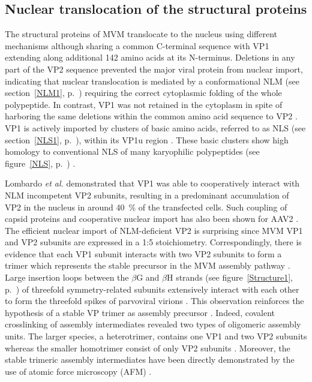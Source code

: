\subsection{Nuclear translocation of the structural proteins}
\label{Struc Transloc}
The structural proteins of MVM translocate to the nucleus using different mechanisms although sharing a common C-terminal sequence with VP1 extending along additional 142 amino acids at its N-terminus. Deletions in any part of the VP2 sequence prevented the major viral protein from nuclear import, indicating that nuclear translocation is mediated by a conformational NLM (see section~\ref{NLM1}, p.~\pageref{NLM1}) requiring the correct cytoplasmic folding of the whole polypeptide. In contrast, VP1 was not retained in the cytoplasm in spite of harboring the same deletions within the common amino acid sequence to VP2 \cite{pmid10729155}. VP1 is actively imported by clusters of basic amino acids, referred to as NLS (see section~\ref{NLS1}, p.~\pageref{NLS1}), within its VP1u region \cite{pmid12072505}. These basic clusters show high homology to conventional NLS of many karyophilic polypeptides (see figure~\ref{NLS}, p.~\pageref{NLS}) \cite{pmid2004116, pmid6088992}. 

Lombardo \textit{et al.} demonstrated that VP1 was able to cooperatively interact with NLM incompetent VP2 subunits, resulting in a predominant accumulation of VP2 in the nucleus in around 40~\% of the transfected cells. Such coupling of capsid proteins and cooperative nuclear import has also been shown for AAV2 \cite{pmid1331503}. The efficient nuclear import of NLM-deficient VP2 is surprising since MVM VP1 and VP2 subunits are expressed in a 1:5 stoichiometry. Correspondingly, there is evidence that each VP1 subunit interacts with two VP2 subunits to form a trimer which represents the stable precursor in the MVM assembly pathway \cite{pmid10729155}. Large insertion loops between the $\beta$G and $\beta$H strands (see figure~\ref{Structure1}, p.~\pageref{Structure1}) of threefold symmetry-related subunits extensively interact with each other \cite{pmid8377200, pmid8969301} to form the threefold spikes of parvoviral virions \cite{pmid9817841, pmid2006420}. This observation reinforces the hypothesis of a stable VP trimer as assembly precursor \cite{pmid10729155}. Indeed, covalent crosslinking of assembly intermediates revealed two types of oligomeric assembly units. The larger species, a heterotrimer, contains one VP1 and two VP2 subunits whereas the smaller homotrimer consist of only VP2 subunits \cite{pmid16469332}. Moreover, the stable trimeric assembly intermediates have been directly demonstrated by the use of atomic force microscopy (AFM) \cite{pmid22713577}.     

